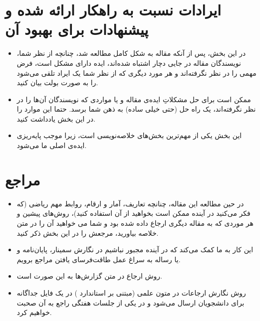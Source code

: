 \documentclass[a4paper,11pt]{article}
\newcommand*\tick{\item[\Checkmark]}
\begin{document}
    \section{ایرادات نسبت به راهکار ارائه شده و پیشنهادات برای بهبود آن}\label{sec:imporvments}

      \begin{itemize}
        \tick { در این بخش، پس از آنکه مقاله به شکل کامل مطالعه شد، چنانچه از نظر شما، نویسندگان مقاله در جایی دچار اشتباه شده‌اند، ایده دارای مشکل است، فرض مهمی را در نظر نگرفته‌اند و هر مورد دیگری که از نظر شما یک ایراد تلقی می‌شود را به صورت بولت بیان کنید.}
        \tick { ممکن است برای حل مشکلاتِ ایده‌ی مقاله و یا مواردی که نویسندگان آن‌ها را در نظر نگرفته‌اند، یک راه حل (حتی خیلی ساده) به ذهن شما برسد. حتما این موارد را در این بخش یادداشت کنید.}
        \tick { این بخش یکی از مهم‌ترین بخش‌های خلاصه‌نویسی است، زیرا موجب پایه‌ریزی ایده‌ی اصلی ما می‌شود.}
      \end{itemize}

    \section{مراجع}\label{sec:ref}

    \begin{itemize}
        \tick {در حین مطالعه این مقاله، چنانچه تعاریف، آمار و ارقام، روابط مهم ریاضی (که فکر می‌کنید در آینده ممکن است بخواهید از آن استفاده کنید)، روش‌های پیشین و هر موردی که به مقاله دیگری ارجاع داده شده بود و شما می خواهید آن را در متن خلاصه بیاورید، مرجعش را در این بخش ذکر کنید.}
        \tick {این کار به ما کمک می‌کند که در آینده مجبور نباشیم در نگارش سمینار، پایان‌نامه و یا رساله به سراغ عمل طاقت‌فرسای یافتن مراجع برویم.}
        \tick {روش ارجاع در متن گزارش‌ها به این صورت است\cite{keshav2007read}.}
        \tick {روش نگارش ارجاعات در متون علمی (مبتنی بر استاندارد ) در یک فایل جداگانه برای دانشجویان ارسال می‌شود و در یکی از جلسات هفتگی راجع به آن صحبت خواهیم کرد.}
    \end{itemize}

    \setLTRbibitems
    
    
    \resetlatinfont
\end{document}
